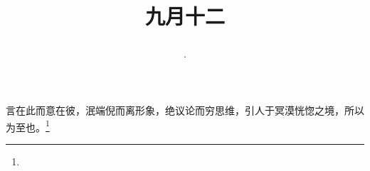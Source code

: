 \title{\date[d=14,m=10,y=2024][year:cn-y,年,month:cn,day:cn,日,·,weekday]·九月十二 }
言在此而意在彼，泯端倪而离形象，绝议论而穷思维，引人于冥漠恍惚之境，所以为至也。\footnote{ }

